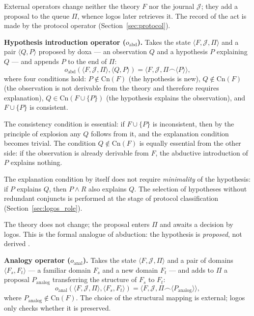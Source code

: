 \documentclass[12pt,a4paper]{article}
\begin{document}
External operators change neither the theory $F$ nor the journal
$\mathcal{J}$; they add a proposal to the queue $\Pi$, whence logos later
retrieves it. The record of the act is made by the protocol operator
(Section~\ref{sec:protocol}).

\textbf{Hypothesis introduction operator ($o_{\text{abd}}$).} Takes the state
$\langle F, \mathcal{J}, \Pi \rangle$ and a pair $\langle Q, P \rangle$
proposed by doxa --- an observation $Q$ and a hypothesis $P$ explaining $Q$ ---
and appends $P$ to the end of $\Pi$:
\[
o_{\text{abd}}(\langle F, \mathcal{J}, \Pi \rangle, \langle Q, P \rangle)
= \langle F, \mathcal{J}, \Pi \frown \langle P \rangle \rangle,
\]
where four conditions hold: $P \notin \mathrm{Cn}(F)$ (the hypothesis is
new), $Q \notin \mathrm{Cn}(F)$ (the observation is not derivable from the
theory and therefore requires explanation), $Q \in \mathrm{Cn}(F \cup \{P\})$
(the hypothesis explains the observation), and $F \cup \{P\}$ is consistent.

The consistency condition is essential: if $F \cup \{P\}$ is inconsistent,
then by the principle of explosion any $Q$ follows from it, and the
explanation condition becomes trivial. The condition $Q \notin \mathrm{Cn}(F)$
is equally essential from the other side: if the observation is already
derivable from $F$, the abductive introduction of $P$ explains nothing.

The explanation condition by itself does not require \emph{minimality} of the
hypothesis: if $P$ explains $Q$, then $P \land R$ also explains $Q$. The
selection of hypotheses without redundant conjuncts is performed at the stage
of protocol classification (Section~\ref{sec:logos_role}).

The theory does not change; the proposal enters $\Pi$ and awaits a decision by
logos. This is the formal analogue of abduction: the hypothesis is
\emph{proposed}, not derived \cite{kakas}.

\textbf{Analogy operator ($o_{\text{anal}}$).} Takes the state
$\langle F, \mathcal{J}, \Pi \rangle$ and a pair of domains
$\langle F_s, F_t \rangle$ --- a familiar domain $F_s$ and a new domain
$F_t$ --- and adds to $\Pi$ a proposal $P_{\text{analog}}$ transferring the
structure of $F_s$ to $F_t$:
\[
o_{\text{anal}}(\langle F, \mathcal{J}, \Pi \rangle, \langle F_s, F_t \rangle)
= \langle F, \mathcal{J}, \Pi \frown \langle P_{\text{analog}} \rangle \rangle,
\]
where $P_{\text{analog}} \notin \mathrm{Cn}(F)$. The choice of the structural
mapping is external; logos only checks whether it is preserved.
\end{document}
